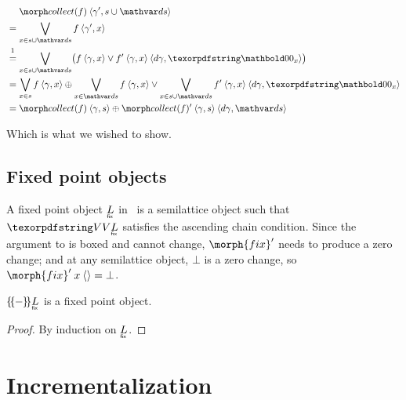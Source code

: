 \nopagebreak[2]
\begin{align*}
  &\phantom{{}={}}\pcollect{f} \<\tuple{\gamma', s \cup \ds}
  \\
  &= \bigvee_{x \in s \cup \ds} f \<\tuple{\gamma', x}
  \\
  &\overset{\footnotemark}{=} \bigvee_{x \in s \cup \ds} \bigl(f \<\tuple{\gamma,x}
  \vee \deriv f \<\tuple{\gamma,x} \<\tuple{\dgamma,\zero_x}\bigr)
  \\
  &= \bigvee_{x \in s} f\<\tuple{\gamma,x}
  \upd \bigvee_{x \in \ds} f\<\tuple{\gamma,x}
  \vee \bigvee_{x \in s \cup \ds} \deriv f \<\tuple{\gamma,x} \<\tuple{\dgamma,\zero_x}
  \\
  &= \pcollect f \<\tuple{\gamma,s}
  \upd \deriv{\pcollect f} \<\tuple{\gamma,s} \<\tuple{\dgamma,\ds}
\end{align*}

\nopagebreak%
\noindent
Which is what we wished to show.


\subsection{Fixed point objects}
\label{sec:CP-fix}

A fixed point object $\fixt L$ in \CP\ is a semilattice object such that
$\vals{\fixt L}$ satisfies the ascending chain condition.  Since the argument to  is boxed and cannot change,
$\deriv{\morph{fix}}$ needs to produce a zero change; and at any semilattice
object, $\bot$ is a zero change, so \( \deriv{\morph{fix}} \<x \<\tuple{} = \bot
\).

\begin{lemma}\label{lem:fixobject}
  \(\incdens{\fixt L}\) is a fixed point object.
\end{lemma}
\begin{proof}
  By induction on $\fixt L$. 
\end{proof}


\section{Incrementalization}
\label{sec:incremental}


